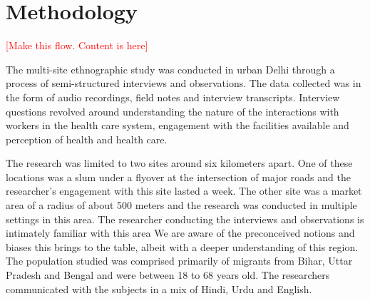 \section{Methodology}

\begin{comment}
This should tell the story of what you did, and the single most important point is to show that you were reflective, rigorous, ethical, sound in your research. 
Start with where you conducted the study. Was there one site or many? How long was your (the authors’) engagement with this site? What was the nature of the engagement? And remember to anonymize by default.
Say what methods you used and who you studied. How long were your interviews? What kinds of questions did you ask? Did you use an interpreter? Who were these people? How old?
Add a paragraph on who the authors are and what they bring to the table. Say what their biases might have been that could be limitations of this work. Was there access you could not get? 
How did you analyze the data? If you used grounded theory, whose version of grounded theory did you use? Who was responsible for the analysis? 
Finally, there are lots of papers that have a decent write-up for methodology. Find a researcher you like and read up on the Methodology section.
\end{comment}

\textcolor{red}{[Make this flow. Content is here]}

The multi-site ethnographic study was conducted in urban Delhi through a process of semi-structured interviews and observations. The data collected was in the form of audio recordings, field notes and interview transcripts. Interview questions revolved around understanding the nature of the interactions with workers in the health care system, engagement with the facilities available and perception of health and health care.

The research was limited to two sites around six kilometers apart. One of these locations was a slum under a flyover at the intersection of major roads and the researcher's engagement with this site lasted a week. The other site was a market area of a radius of about 500 meters and the research was conducted in multiple settings in this area. 
The researcher conducting the interviews and observations is intimately familiar with this area %
We are aware of the preconceived notions and biases this brings to the table, albeit with a deeper understanding of this region. The population studied was comprised primarily of migrants from Bihar, Uttar Pradesh and Bengal
and were between 18 to 68 years old. The researchers communicated with the subjects in a mix of Hindi, Urdu and English.

